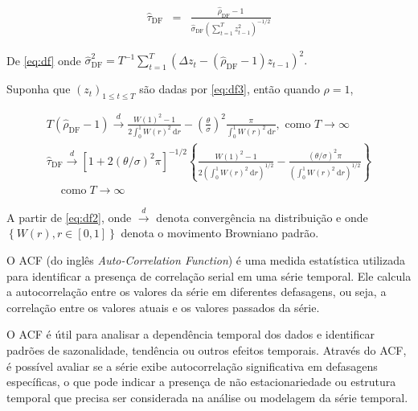 \begin{eqnarray}
	\hat{\tau}_{\mathrm{DF}}&=&\frac{\hat{\rho}_{\mathrm{DF}}-1}{\hat{\sigma}_{\mathrm{DF}}\left(\sum_{t=1}^T z_{t-1}^2\right)^{-1 / 2}} \label{eq:df}
\end{eqnarray}

De \eqref{eq:df} onde $\hat{\sigma}_{\mathrm{DF}}^2=T^{-1} \sum_{t=1}^T\left(\Delta z_t-\left(\hat{\rho}_{\mathrm{DF}}-1\right) z_{t-1}\right)^2 .$



Suponha que $\left(z_t\right)_{1 \leq t \leq T}$ são dadas por \eqref{eq:df3}, então quando $\rho=1$,


\begin{eqnarray}
	T\left(\hat{\rho}_{\mathrm{DF}}-1\right) \stackrel{d}{\longrightarrow} \frac{W(1)^2-1}{2 \int_0^1 W(r)^2 \mathrm{~d} r}-\left(\frac{\theta}{\sigma}\right)^2 \frac{\pi}{\int_0^1 W(r)^2 \mathrm{~d} r}, \text { como } T \rightarrow \infty \\
	\hat{\tau}_{\mathrm{DF}} \stackrel{d}{\longrightarrow}\left[1+2(\theta / \sigma)^2 \pi\right]^{-1 / 2}\left\{\frac{W(1)^2-1}{2\left(\int_0^1 W(r)^2 \mathrm{~d} r\right)^{1 / 2}}-\frac{(\theta / \sigma)^2 \pi}{\left(\int_0^1 W(r)^2 \mathrm{~d} r\right)^{1 / 2}}\right\} \\
	\quad \operatorname{como} T \rightarrow \infty\label{eq:df2}
\end{eqnarray}

A partir de \eqref{eq:df2}, onde $\stackrel{d}{\longrightarrow}$ denota convergência na distribuição e onde $\left\{W(r), r \in[0,1]\right\}$ denota o movimento Browniano padrão.

O ACF (do inglês \textit{Auto-Correlation Function}) é uma medida estatística utilizada para identificar a presença de correlação serial em uma série temporal. Ele calcula a autocorrelação entre os valores da série em diferentes defasagens, ou seja, a correlação entre os valores atuais e os valores passados da série. 

O ACF é útil para analisar a dependência temporal dos dados e identificar padrões de sazonalidade, tendência ou outros efeitos temporais. Através do ACF, é possível avaliar se a série exibe autocorrelação significativa em defasagens específicas, o que pode indicar a presença de não estacionariedade ou estrutura temporal que precisa ser considerada na análise ou modelagem da série temporal.


